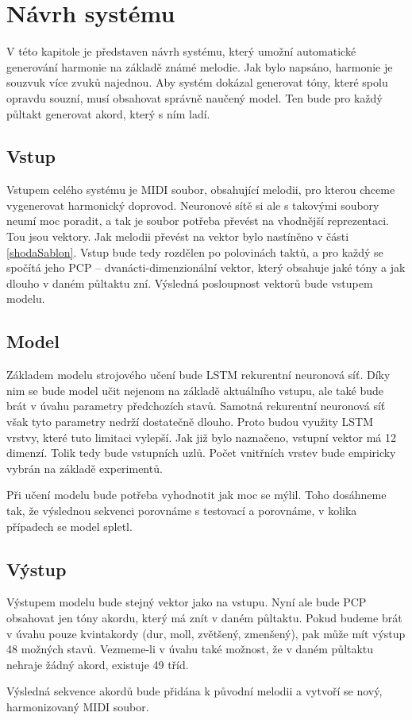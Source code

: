 
\chapter{Návrh systému}
V této kapitole je představen návrh systému,
který umožní automatické generování harmonie na základě známé melodie.
Jak bylo napsáno, harmonie je souzvuk více zvuků najednou.
Aby systém dokázal generovat tóny, které spolu opravdu souzní,
musí obsahovat správně naučený model.
Ten bude pro každý půltakt generovat akord,
který s ním ladí.

\section{Vstup}
Vstupem celého systému je MIDI soubor, obsahující melodii,
pro kterou chceme vygenerovat harmonický doprovod.
Neuronové sítě si ale s takovými soubory neumí moc poradit,
a tak je soubor potřeba převést na vhodnější reprezentaci.
Tou jsou vektory.
Jak melodii převést na vektor bylo nastíněno v části \ref{shodaSablon}.
Vstup bude tedy rozdělen po polovinách taktů, 
a pro každý se spočítá jeho PCP -- dvanácti-dimenzionální vektor,
který obsahuje jaké tóny a jak dlouho v daném půltaktu zní.
Výsledná posloupnost vektorů bude vstupem modelu.

\section{Model}
Základem modelu strojového učení bude LSTM rekurentní neuronová síť.
Díky nim se bude model učit nejenom na základě aktuálního vstupu,
ale také bude brát v úvahu parametry předchozích stavů.
Samotná rekurentní neuronová síť však tyto parametry nedrží dostatečně dlouho.
Proto budou využity LSTM vrstvy, 
které tuto limitaci vylepší.
Jak již bylo naznačeno, 
vstupní vektor má 12 dimenzí.
Tolik tedy bude vstupních uzlů.
Počet vnitřních vrstev bude empiricky vybrán na základě experimentů.
\par
Při učení modelu bude potřeba vyhodnotit jak moc se mýlil.
Toho dosáhneme tak, že výslednou sekvenci porovnáme s
testovací a porovnáme, v kolika případech se model spletl.



\section{Výstup}
Výstupem modelu bude stejný vektor jako na vstupu.
Nyní ale bude PCP obsahovat jen tóny akordu, 
který má znít v daném půltaktu.
Pokud budeme brát v úvahu pouze kvintakordy (dur, moll, zvětšený, zmenšený),
pak může mít výstup 48 možných stavů.
Vezmeme-li v úvahu také možnost, že v daném půltaktu nehraje žádný akord,
existuje 49 tříd.
\par
Výsledná sekvence akordů bude přidána k původní melodii
a vytvoří se nový, harmonizovaný MIDI soubor.


